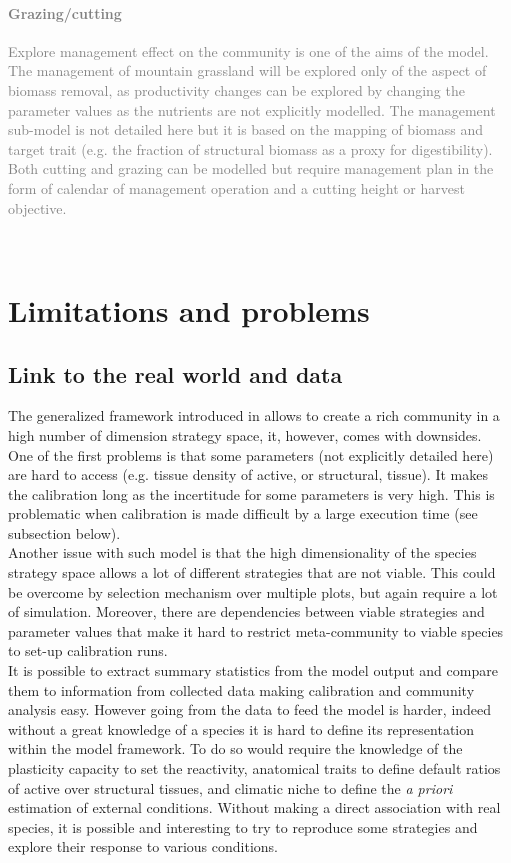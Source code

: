 \textcolor{gray}{\paragraph{Grazing/cutting} Explore management effect on the community is one of the aims of the \model model. The management of mountain grassland will be explored only of the aspect of biomass removal, as productivity changes can be explored by changing the parameter values as the nutrients are not explicitly modelled. The management sub-model is not detailed here but it is based on the mapping of biomass and target trait (e.g. the fraction of structural biomass as a proxy for digestibility). Both cutting and grazing can be modelled but require management plan in the form of calendar of management operation and a cutting height or harvest objective.}\\

\section{Limitations and problems}

\subsection{Link to the real world and data}
The generalized framework introduced in \model allows to create a rich community in a high number of dimension strategy space, it, however, comes with downsides.\\
\indent One of the first problems is that some parameters (not explicitly detailed here) are hard to access (e.g. tissue density of active, or structural, tissue). It makes the calibration long as the incertitude for some parameters is very high. This is problematic when calibration is made difficult by a large execution time (see subsection below).\\
\indent Another issue with such model is that the high dimensionality of the species strategy space allows a lot of different strategies that are not viable. This could be overcome by selection mechanism over multiple plots, but again require a lot of simulation. Moreover, there are dependencies between viable strategies and parameter values that make it hard to restrict meta-community to viable species to set-up calibration runs.\\
\indent It is possible to extract summary statistics from the model output and compare them to information from collected data making calibration and community analysis easy. However going from the data to feed the model is harder, indeed without a great knowledge of a species it is hard to define its representation within the model framework. To do so would require the knowledge of the plasticity capacity to set the reactivity, anatomical traits to define default ratios of active over structural tissues, and climatic niche to define the \textit{a priori} estimation of external conditions. Without making a direct association with real species, it is possible and interesting to try to reproduce some strategies and explore their response to various conditions.

